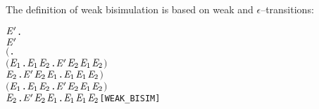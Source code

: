 The definition of weak bisimulation is based on weak and $\epsilon$--transitions:
\begin{alltt}
  \HOLTokenDefEquality{}
  \HOLSymConst{\HOLTokenForall{}} \ensuremath{\HOLBoundVar{E}\sp{\prime}}.
        \ensuremath{\HOLBoundVar{E}\sp{\prime}} \HOLSymConst{\HOLTokenImp{}}
      \ensuremath{(}\HOLSymConst{\HOLTokenForall{}}.
           \ensuremath{(}\HOLSymConst{\HOLTokenForall{}}\ensuremath{\HOLBoundVar{E}\sb{\mathrm{1}}}.  \HOLTokenTransBegin{} \HOLTokenTransEnd \ensuremath{\HOLBoundVar{E}\sb{\mathrm{1}}} \HOLSymConst{\HOLTokenImp{}} \HOLSymConst{\HOLTokenExists{}}\ensuremath{\HOLBoundVar{E}\sb{\mathrm{2}}}. \ensuremath{\HOLBoundVar{E}\sp{\prime}} \HOLTokenWeakTransBegin{} \HOLTokenWeakTransEnd \ensuremath{\HOLBoundVar{E}\sb{\mathrm{2}}} \HOLSymConst{\HOLTokenConj{}}  \ensuremath{\HOLBoundVar{E}\sb{\mathrm{1}}} \ensuremath{\HOLBoundVar{E}\sb{\mathrm{2}}}\ensuremath{)} \HOLSymConst{\HOLTokenConj{}}
           \HOLSymConst{\HOLTokenForall{}}\ensuremath{\HOLBoundVar{E}\sb{\mathrm{2}}}. \ensuremath{\HOLBoundVar{E}\sp{\prime}} \HOLTokenTransBegin{} \HOLTokenTransEnd \ensuremath{\HOLBoundVar{E}\sb{\mathrm{2}}} \HOLSymConst{\HOLTokenImp{}} \HOLSymConst{\HOLTokenExists{}}\ensuremath{\HOLBoundVar{E}\sb{\mathrm{1}}}.  \HOLTokenWeakTransBegin{} \HOLTokenWeakTransEnd \ensuremath{\HOLBoundVar{E}\sb{\mathrm{1}}} \HOLSymConst{\HOLTokenConj{}}  \ensuremath{\HOLBoundVar{E}\sb{\mathrm{1}}} \ensuremath{\HOLBoundVar{E}\sb{\mathrm{2}}}\ensuremath{)} \HOLSymConst{\HOLTokenConj{}}
      \ensuremath{(}\HOLSymConst{\HOLTokenForall{}}\ensuremath{\HOLBoundVar{E}\sb{\mathrm{1}}}.  \HOLTokenTransBegin\HOLSymConst{\ensuremath{\tau}}\HOLTokenTransEnd \ensuremath{\HOLBoundVar{E}\sb{\mathrm{1}}} \HOLSymConst{\HOLTokenImp{}} \HOLSymConst{\HOLTokenExists{}}\ensuremath{\HOLBoundVar{E}\sb{\mathrm{2}}}. \ensuremath{\HOLBoundVar{E}\sp{\prime}} \HOLSymConst{\HOLTokenEPS} \ensuremath{\HOLBoundVar{E}\sb{\mathrm{2}}} \HOLSymConst{\HOLTokenConj{}}  \ensuremath{\HOLBoundVar{E}\sb{\mathrm{1}}} \ensuremath{\HOLBoundVar{E}\sb{\mathrm{2}}}\ensuremath{)} \HOLSymConst{\HOLTokenConj{}}
      \HOLSymConst{\HOLTokenForall{}}\ensuremath{\HOLBoundVar{E}\sb{\mathrm{2}}}. \ensuremath{\HOLBoundVar{E}\sp{\prime}} \HOLTokenTransBegin\HOLSymConst{\ensuremath{\tau}}\HOLTokenTransEnd \ensuremath{\HOLBoundVar{E}\sb{\mathrm{2}}} \HOLSymConst{\HOLTokenImp{}} \HOLSymConst{\HOLTokenExists{}}\ensuremath{\HOLBoundVar{E}\sb{\mathrm{1}}}.  \HOLSymConst{\HOLTokenEPS} \ensuremath{\HOLBoundVar{E}\sb{\mathrm{1}}} \HOLSymConst{\HOLTokenConj{}}  \ensuremath{\HOLBoundVar{E}\sb{\mathrm{1}}} \ensuremath{\HOLBoundVar{E}\sb{\mathrm{2}}}\hfill{[WEAK_BISIM]}
\end{alltt}

